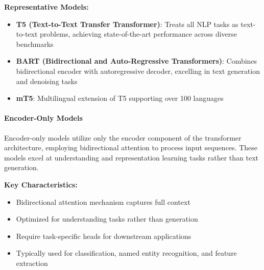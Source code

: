 \documentclass[12pt,a4paper]{article}
\begin{document}
\textbf{Representative Models:}
\begin{itemize}
    \item \textbf{T5 (Text-to-Text Transfer Transformer)}: Treats all NLP tasks as text-to-text problems, achieving state-of-the-art performance across diverse benchmarks
    \item \textbf{BART (Bidirectional and Auto-Regressive Transformers)}: Combines bidirectional encoder with autoregressive decoder, excelling in text generation and denoising tasks
    \item \textbf{mT5}: Multilingual extension of T5 supporting over 100 languages
\end{itemize}

\paragraph{Encoder-Only Models}


Encoder-only models utilize only the encoder component of the transformer architecture, employing bidirectional attention to process input sequences. These models excel at understanding and representation learning tasks rather than text generation.

\textbf{Key Characteristics:}
\begin{itemize}
    \item Bidirectional attention mechanism captures full context
    \item Optimized for understanding tasks rather than generation
    \item Require task-specific heads for downstream applications
    \item Typically used for classification, named entity recognition, and feature extraction
\end{itemize}
\end{document}
